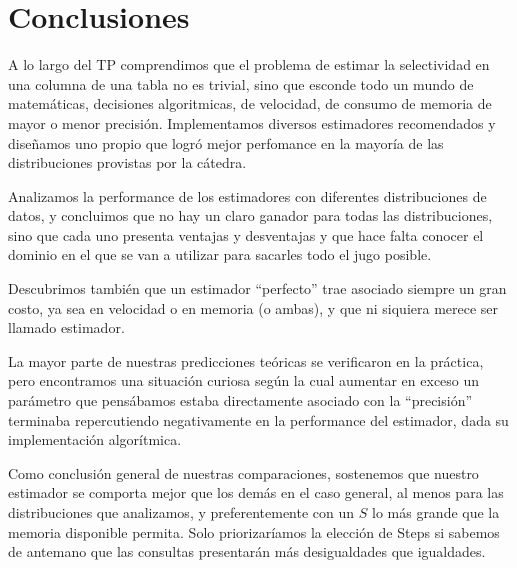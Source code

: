 \section{Conclusiones}
A lo largo del TP comprendimos que el problema de estimar la selectividad en una columna de una tabla no es trivial, sino que esconde todo un mundo de matemáticas, decisiones algoritmicas, de velocidad, de consumo de memoria de mayor o menor precisión. Implementamos diversos estimadores recomendados y diseñamos uno propio que logró mejor perfomance en la mayoría de las distribuciones provistas por la cátedra.

Analizamos la performance de los estimadores con diferentes distribuciones de datos, y concluimos que no hay un claro ganador para todas las distribuciones, sino que cada uno presenta ventajas y desventajas y que hace falta conocer el dominio en el que se van a utilizar para sacarles todo el jugo posible.

Descubrimos también que un estimador ``perfecto'' trae asociado siempre un gran costo, ya sea en velocidad o en memoria (o ambas), y que ni siquiera merece ser llamado estimador.

La mayor parte de nuestras predicciones teóricas se verificaron en la práctica, pero encontramos una situación curiosa según la cual aumentar en exceso un parámetro que pensábamos estaba directamente asociado con la ``precisión'' terminaba repercutiendo negativamente en la performance del estimador, dada su implementación algorítmica.

Como conclusión general de nuestras comparaciones, sostenemos que nuestro estimador se comporta mejor que los demás en el caso general, al menos para las distribuciones que analizamos, y preferentemente con un $S$ lo más grande que la memoria disponible permita. Solo priorizaríamos la elección de Steps si sabemos de antemano que las consultas presentarán más desigualdades que igualdades.